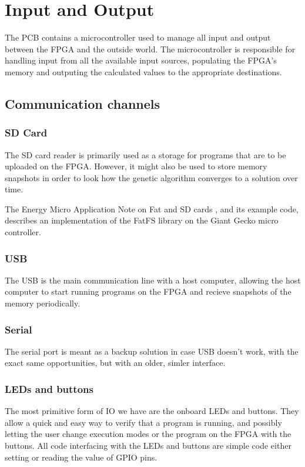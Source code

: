 \section{Input and Output}
The PCB contains a microcontroller used to manage all input and output between the FPGA and the outside world.
The microcontroller is responsible for handling input from all the available input sources, populating the FPGA's memory and outputing the calculated values to the appropriate destinations.

\subsection{Communication channels}
\subsubsection{SD Card}
The SD card reader is primarily used as a storage for programs that are to be uploaded on the FPGA.
However, it might also be used to store memory snapshots in order to look how the genetic algorithm converges to a solution over time.

The Energy Micro Application Note on Fat and SD cards , and its example code, describes an implementation of the FatFS library on the Giant Gecko micro controller.


\subsubsection{USB}
The USB is the main communication line with a host computer, allowing the host computer to start running programs on the FPGA and recieve snapshots of the memory periodically.

\subsubsection{Serial}
The serial port is meant as a backup solution in case USB doesn't work, with the exact same opportunities, but with an older, simler interface.

\subsubsection{LEDs and buttons}
The most primitive form of IO we have are the onboard LEDs and buttons.
They allow a quick and easy way to verify that a program is running, and possibly letting the user change execution modes or the program on the FPGA with the buttons.
All code interfacing with the LEDs and buttons are simple code either setting or reading the value of GPIO pins.

